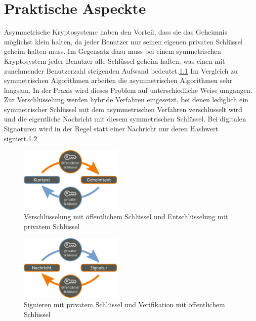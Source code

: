 
\chapter{Praktische Aspeckte}
\label{chapter-aspeckte}
Asymmetrische Kryptosysteme haben den Vorteil, dass sie das Geheimnis möglichst klein halten, da jeder Benutzer nur seinen eigenen privaten Schlüssel geheim halten muss. Im Gegensatz dazu muss bei einem symmetrischen Kryptosystem jeder Benutzer alle Schlüssel geheim halten, was einen mit zunehmender Benutzerzahl steigenden Aufwand bedeutet.\ref{abc}
Im Vergleich zu symmetrischen Algorithmen arbeiten die asymmetrischen Algorithmen sehr langsam. In der Praxis wird dieses Problem auf unterschiedliche Weise umgangen. Zur Verschlüsselung werden hybride Verfahren eingesetzt, bei denen lediglich ein symmetrischer Schlüssel mit dem asymmetrischen Verfahren verschlüsselt wird und die eigentliche Nachricht mit diesem symmetrischen Schlüssel. Bei digitalen Signaturen wird in der Regel statt einer Nachricht nur deren Hashwert signiert.\ref{abcd}
\begin{figure}
	\label{abc}
	\begin{center}
		\includegraphics[width=5cm]{abcde.png}	
	\end{center}
	\caption{Verschlüsselung mit öffentlichem Schlüssel und Entschlüsselung mit privatem Schlüssel}
	
\end{figure}
\begin{figure}
	\label{abcd}
	\begin{center}
		\includegraphics[width=5cm]{ab.png}	
	\end{center}
	\caption{Signieren mit privatem Schlüssel und Verifikation mit öffentlichem Schlüssel}
	
\end{figure}



